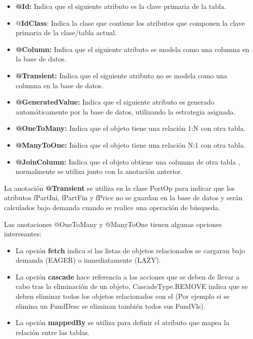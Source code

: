 \documentclass[12pt, a4paper]{article}
\begin{document}
\begin{itemize}
	\item \textbf{@Id:} Indica que el siguiente atributo es la clave primaria de la tabla.
	\item @\textbf{IdClass}: Indica la clase que contiene los atributos que componen la clave primaria de la clase/tabla actual.
	\item  \textbf{@Column:} Indica que el siguiente atributo se modela como una columna en la base de datos.
	\item  \textbf{@Transient:} Indica que el siguiente atributo no se modela como una columna en la base de datos.
	\item \textbf{@GeneratedValue:} Indica que el siguiente atributo es generado automáticamente por la base de datos, utilizando la estrategia asignada.
	\item \textbf{@OneToMany:} Indica que el objeto tiene una relación 1:N con otra tabla.
	\item\textbf{@ManyToOne:} Indica que el objeto tiene una relación N:1 con otra tabla.
	\item\textbf{@JoinColumn:} Indica que el objeto obtiene una columna de otra tabla , normalmente se utiliza junto con la anotación anterior.\\
\end{itemize}

La anotación \textbf{@Transient} se utiliza en la clase PortOp para indicar que los atributos fPartIni, fPartFin y fPrice no se guardan en la base de datos y serán calculados bajo demanda cuando se realice una operación de búsqueda.

\newpage
Las anotaciones @OneToMany y @ManyToOne tienen algunas opciones interesantes:
\begin{itemize}
	\item La opción \textbf{fetch} indica si las listas de objetos relacionados se cargaran bajo demanda (EAGER) o inmediatamente (LAZY).
	\item La opción \textbf{cascade} hace referencia a las acciones que se deben de llevar a cabo tras la eliminación de un objeto, CascadeType.REMOVE indica que se deben eliminar todos los objetos relacionados con el (Por ejemplo si se elimina un FundDesc se eliminan también todos sus FundVls).
	\item La opción \textbf{mappedBy} se utiliza para definir el atributo que mapea la relación entre las tablas.\\
\end{itemize}
\end{document}
